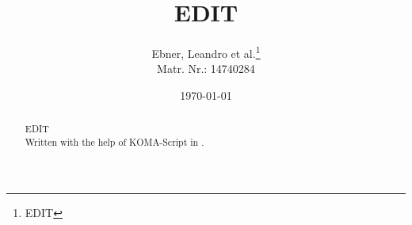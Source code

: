 \documentclass{scrartcl}                    %
\begin{document}
\title{EDIT}
\author{Ebner, Leandro et al.\thanks{EDIT} \\ Matr. Nr.: 14740284}
\date{\today}
\maketitle

\begin{abstract}
EDIT \\
Written with the help of KOMA-Script in \LaTeXe{}.
\end{abstract}

\tableofcontents
\newpage
\printbibliography
\end{document}
